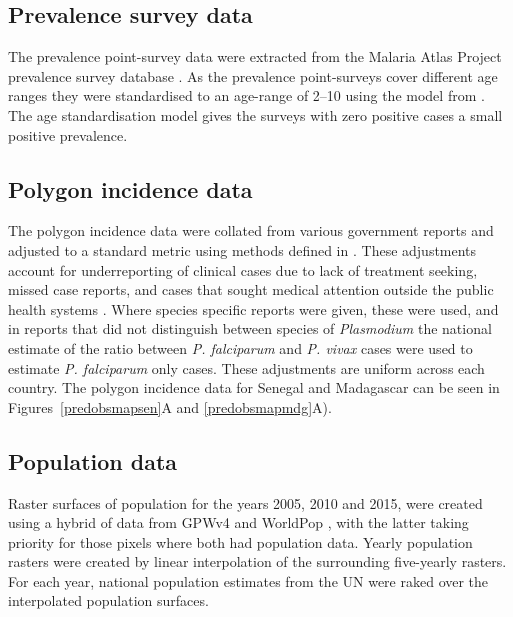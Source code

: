 \documentclass{statsoc}
\begin{document}
\subsection*{Prevalence survey data}

The prevalence point-survey data were extracted from the Malaria Atlas Project prevalence survey database \citep{bhatt2015effect, guerra2007assembling, gething2011new, pfeffer2018ma}.
As the prevalence point-surveys cover different age ranges they were standardised to an age-range of 2--10 using the model from \citep{smith2007standardizing}.
The age standardisation model gives the surveys with zero positive cases a small positive prevalence.

\subsection*{Polygon incidence data}


The polygon incidence data were collated from various government reports and adjusted to a standard metric using methods defined in \citep{cibulskis2011worldwide, weiss2019mapping}.
These adjustments account for underreporting of clinical cases due to lack of treatment seeking, missed case reports, and cases that sought medical attention outside the public health systems \citep{battle2016treatment}.
Where species specific reports were given, these were used, and in reports that did not distinguish between species of \emph{Plasmodium} the national estimate of the ratio between \emph{P. falciparum} and \emph{P. vivax} cases were used to estimate \emph{P. falciparum} only cases.
These adjustments are uniform across each country.
The polygon incidence data for Senegal and Madagascar can be seen in Figures~\ref{predobsmapsen}A and \ref{predobsmapmdg}A).


\subsection*{Population data}

Raster surfaces of population for the years 2005, 2010 and 2015, were created using a hybrid of data from GPWv4 \citep{gpw4} and WorldPop \citep{tatem2017worldpop}, with the latter taking priority for those pixels where both had population data. 
Yearly population rasters were created by linear interpolation of the surrounding five-yearly rasters.
For each year, national population estimates from the UN were raked over the interpolated population surfaces. 
\end{document}
